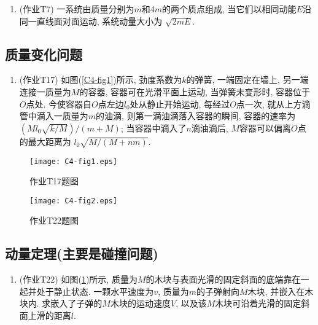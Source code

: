 \begin{enumerate}
	
	\item (作业T7) 一系统由质量分别为$m$和$4m$的两个质点组成, 当它们以相同动能$E$沿同一直线面对面运动, 系统动量大小为 \uline{$\sqrt{2mE}$}. 
	
\end{enumerate}

\subsection{质量变化问题}

\begin{enumerate}
	
	\item (作业T17) 如图(\ref{C4-fig1})所示, 劲度系数为$k$的弹簧, 一端固定在墙上, 另一端连接一质量为$M$的容器, 容器可在光滑平面上运动, 当弹簧未变形时, 容器位于$O$点处. 今使容器自$O$点左边$l_0$处从静止开始运动, 每经过$O$点一次, 就从上方滴管中滴入一质量为$m$的油滴, 则第一滴油滴落入容器的瞬间, 容器的速率为 \uline{$(M l_0 \sqrt{k/M}) / (m + M)$}; 当容器中滴入了$n$滴油滴后, $M$容器可以偏离$O$点的最大距离为 \uline{$l_0 \sqrt{M/(M + nm)}$}. 
	
\end{enumerate}

\begin{figure}[htbp]
	\centering
	\begin{minipage}[t]{0.48\textwidth}
		\centering
		\texttt{[image: C4-fig1.eps]}
		\caption{作业T17题图}
		\label{C4-fig1}
	\end{minipage}
	\begin{minipage}[t]{0.48\textwidth}
		\centering
		\texttt{[image: C4-fig2.eps]}
		\caption{作业T22题图}
		\label{C4-fig2}
	\end{minipage}
\end{figure}

\subsection{动量定理(主要是碰撞问题)}

\begin{enumerate}
	
	\item (作业T22) 如图(\ref{C4-fig2})所示, 质量为$M$的木块与表面光滑的固定斜面的底端靠在一起并处于静止状态. 一颗水平速度为$v$, 质量为$m$的子弹射向$M$木块, 并嵌入在木块内. 求嵌入了子弹的$M$木块的运动速度$V$, 以及该$M$木块可沿着光滑的固定斜面上滑的距离$l$. 
	
\end{enumerate}
